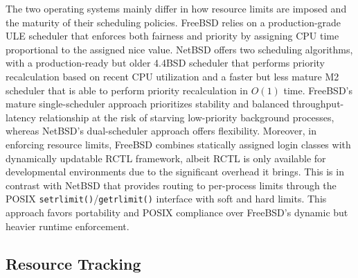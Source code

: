 The two operating systems mainly differ in how resource limits are imposed and the maturity of their scheduling policies.
FreeBSD relies on a production-grade ULE scheduler that enforces both fairness and priority by assigning CPU time proportional
to the assigned nice value. NetBSD offers two scheduling algorithms, with a production-ready but older 4.4BSD scheduler
that performs priority recalculation based on recent CPU utilization and a faster but less mature M2 scheduler that is
able to perform priority recalculation in $O(1)$ time. FreeBSD's mature single-scheduler approach prioritizes stability
and balanced throughput-latency relationship at the risk of starving low-priority background processes, whereas NetBSD's
dual-scheduler approach offers flexibility. Moreover, in enforcing resource limits, FreeBSD combines statically assigned
login classes with dynamically updatable RCTL framework, albeit RCTL is only available for developmental environments
due to the significant overhead it brings. This is in contrast with NetBSD that provides routing to per-process limits
through the POSIX \texttt{setrlimit()}/\texttt{getrlimit()} interface with soft and hard limits. This approach favors
portability and POSIX compliance over FreeBSD's dynamic but heavier runtime enforcement.

\subsection{Resource Tracking} \label{resource-tracking} %

